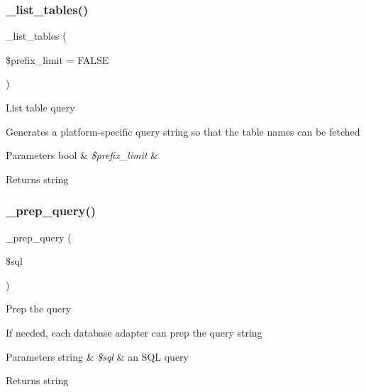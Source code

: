 \subsubsection{\texorpdfstring{\+\_\+list\+\_\+tables()}{\_list\_tables()}}
{\footnotesize\ttfamily \+\_\+list\+\_\+tables (\begin{DoxyParamCaption}\item[{}]{\$prefix\+\_\+limit = {\ttfamily FALSE} }\end{DoxyParamCaption})\hspace{0.3cm}{\ttfamily [protected]}}

List table query

Generates a platform-\/specific query string so that the table names can be fetched


\begin{DoxyParams}[1]{Parameters}
bool & {\em \$prefix\+\_\+limit} & \\
\hline
\end{DoxyParams}
\begin{DoxyReturn}{Returns}
string 
\end{DoxyReturn}
\mbox{\label{class_c_i___d_b__mysql__driver_a86af88ef0fa6d44ab4691e3f53270339}} 
\subsubsection{\texorpdfstring{\+\_\+prep\+\_\+query()}{\_prep\_query()}}
{\footnotesize\ttfamily \+\_\+prep\+\_\+query (\begin{DoxyParamCaption}\item[{}]{\$sql }\end{DoxyParamCaption})\hspace{0.3cm}{\ttfamily [protected]}}

Prep the query

If needed, each database adapter can prep the query string


\begin{DoxyParams}[1]{Parameters}
string & {\em \$sql} & an S\+QL query \\
\hline
\end{DoxyParams}
\begin{DoxyReturn}{Returns}
string 
\end{DoxyReturn}
\mbox{\label{class_c_i___d_b__mysql__driver_ac81ac882c1d54347d810199a15856aac}} 
